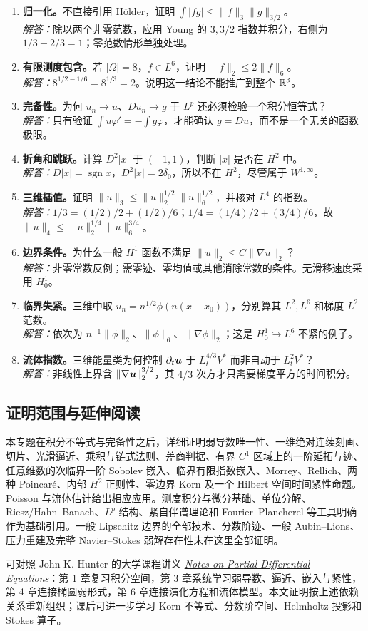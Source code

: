 \begin{enumerate}
 \item \textbf{归一化。}不直接引用 H\"older，证明 $\int|fg|\le\|f\|_3\|g\|_{3/2}$。\\
 \textit{解答：}除以两个非零范数，应用 Young 的 $3,3/2$ 指数并积分，右侧为 $1/3+2/3=1$；零范数情形单独处理。
 \item \textbf{有限测度包含。}若 $|\Omega|=8$，$f\in L^6$，证明 $\|f\|_2\le2\|f\|_6$。\\
 \textit{解答：}$8^{1/2-1/6}=8^{1/3}=2$。说明这一结论不能推广到整个 $\mathbb R^3$。
 \item \textbf{完备性。}为何 $u_n\to u$、$Du_n\to g$ 于 $L^p$ 还必须检验一个积分恒等式？\\
 \textit{解答：}只有验证 $\int u\varphi'=-\int g\varphi$，才能确认 $g=Du$，而不是一个无关的函数极限。
 \item \textbf{折角和跳跃。}计算 $D^2|x|$ 于 $(-1,1)$，判断 $|x|$ 是否在 $H^2$ 中。\\
 \textit{解答：}$D|x|=\operatorname{sgn}x$，$D^2|x|=2\delta_0$，所以不在 $H^2$，尽管属于 $W^{1,\infty}$。
 \item \textbf{三维插值。}证明 $\|u\|_3\le\|u\|_2^{1/2}\|u\|_6^{1/2}$，并核对 $L^4$ 的指数。\\
 \textit{解答：}$1/3=(1/2)/2+(1/2)/6$；$1/4=(1/4)/2+(3/4)/6$，故 $\|u\|_4\le\|u\|_2^{1/4}\|u\|_6^{3/4}$。
 \item \textbf{边界条件。}为什么一般 $H^1$ 函数不满足 $\|u\|_2\le C\|\nabla u\|_2$？\\
 \textit{解答：}非零常数反例；需零迹、零均值或其他消除常数的条件。无滑移速度采用 $H^1_0$。
 \item \textbf{临界失紧。}三维中取 $u_n=n^{1/2}\phi(n(x-x_0))$，分别算其 $L^2,L^6$ 和梯度 $L^2$ 范数。\\
 \textit{解答：}依次为 $n^{-1}\|\phi\|_2$、$\|\phi\|_6$、$\|\nabla\phi\|_2$；这是 $H^1_0\hookrightarrow L^6$ 不紧的例子。
 \item \textbf{流体指数。}三维能量类为何控制 $\partial_t\bm{u}$ 于 $L^{4/3}_tV^*$ 而非自动于 $L^2_tV^*$？\\
 \textit{解答：}非线性上界含 $\|\nabla\bm{u}\|_2^{3/2}$，其 $4/3$ 次方才只需要梯度平方的时间积分。
\end{enumerate}

\subsection{证明范围与延伸阅读}

本专题在积分不等式与完备性之后，详细证明弱导数唯一性、一维绝对连续刻画、切片、光滑逼近、乘积与链式法则、差商判据、有界 $C^1$ 区域上的一阶延拓与迹、任意维数的次临界一阶 Sobolev 嵌入、临界有限指数嵌入、Morrey、Rellich、两种 Poincar\'e、内部 $H^2$ 正则性、零边界 Korn 及一个 Hilbert 空间时间紧性命题。Poisson 与流体估计给出相应应用。测度积分与微分基础、单位分解、Riesz/Hahn--Banach、$L^p$ 结构、紧自伴谱理论和 Fourier--Plancherel 等工具明确作为基础引用。一般 Lipschitz 边界的全部技术、分数阶迹、一般 Aubin--Lions、压力重建及完整 Navier--Stokes 弱解存在性未在这里全部证明。

可对照 John K. Hunter 的大学课程讲义
\href{https://www.math.ucdavis.edu/~hunter/pdes/pde_notes.pdf}{\textit{Notes on Partial Differential Equations}}：第 1 章复习积分空间，第 3 章系统学习弱导数、逼近、嵌入与紧性，第 4 章连接椭圆弱形式，第 6 章连接演化方程和流体模型。本文证明按上述依赖关系重新组织；课后可进一步学习 Korn 不等式、分数阶空间、Helmholtz 投影和 Stokes 算子。

